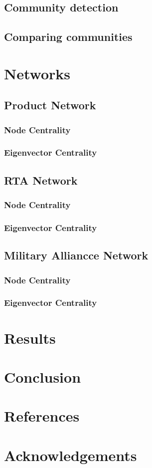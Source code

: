 \documentclass[a4paper, 12pt]{article}
\begin{document}
    \subsection{Community detection}
    \subsection{Comparing communities}
\newpage

\section{Networks}
    \subsection{Product Network}
        \subsubsection{Node Centrality}
        \subsubsection{Eigenvector Centrality}
    \subsection{RTA Network}
        \subsubsection{Node Centrality}
        \subsubsection{Eigenvector Centrality}
    \subsection{Military Alliancce Network}
        \subsubsection{Node Centrality}
        \subsubsection{Eigenvector Centrality}
\newpage

\section{Results}
\newpage

\section{Conclusion}
\newpage

\section{References}
\newpage

\section{Acknowledgements}
\newpage




\end{document}
